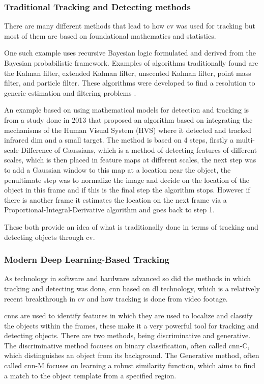 \documentclass[12pt,a4paper]{article}
\begin{document}
\subsubsection{Traditional Tracking and Detecting methods}
There are many different methods that lead to how \acs{cv} was used for tracking but most of them are based on foundational mathematics and statistics. 

One such example uses recursive Bayesian logic formulated and derived from the Bayesian probabilistic framework. Examples of algorithms traditionally found are the Kalman filter, extended Kalman filter, unscented Kalman filter, point mass filter, and particle filter. These algorithms were developed to find a resolution to generic estimation and filtering problems \parencite{challa2011fundamentals}.

An example based on using mathematical models for detection and tracking is from a study done in 2013 that proposed an algorithm based on integrating the mechanisms of the Human Visual System (HVS) where it detected and tracked infrared dim and a small target. The method is based on 4 steps, firstly a multi-scale Difference of Gaussians, which is a method of detecting features of different scales, which is then placed in feature maps at different scales, the next step was to add a Gaussian window to this map at a location near the object, the penultimate step was to normalize the image and decide on the location of the object in this frame and if this is the final step the algorithm stops. However if there is another frame it estimates the location on the next frame via a Proportional-Integral-Derivative algorithm and goes back to step 1\parencite{Mirzaei2016, dong2014infrared}.

These both provide an idea of what is traditionally done in terms of tracking and detecting objects through \acs{cv}.

\subsubsection{Modern Deep Learning-Based Tracking}
As technology in software and hardware advanced so did the methods in which tracking and detecting was done, \acl{cnn} based on \acl{dl} technology\parencite{pal2021deep}, which is a relatively recent breakthrough in \acs{cv} and how tracking is done from video footage.

\acs{cnn}s are used to identify features in which they are used to localize and classify the objects within the frames\parencite{pal2021deep}, these make it a very powerful tool for tracking and detecting objects. There are two methods, being discriminative and generative. The discriminative method focuses on binary classification, often called \acs{cnn}-C, which distinguishes an object from its background. The Generative method, often called \acs{cnn}-M focuses on learning a robust similarity function, which aims to find a match to the object template from a specified region\parencite{li2018deep}.
\end{document}
